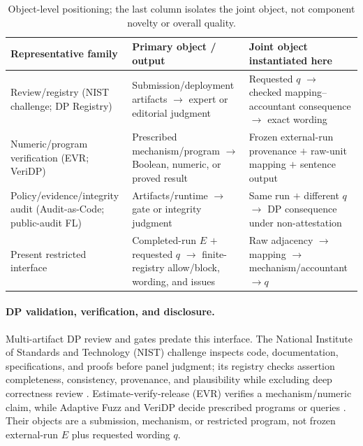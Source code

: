 \documentclass[letterpaper]{article} %
\begin{document}
\begin{table}[t]
\centering
{\small
\begin{tabular}{@{}p{}p{}p{}@{}}
\toprule
\raggedright\strut Representative family
& \raggedright\strut Primary object / output
& \raggedright\strut Joint object instantiated here \tabularnewline
\midrule
\raggedright\strut Review/registry (NIST challenge; DP Registry) \citep{ridgeway2021challenge,nist2025registry}
& \raggedright\strut Submission/deployment artifacts $\rightarrow$ expert or editorial judgment
& \raggedright\strut Requested $q$ $\rightarrow$ checked mapping--accountant consequence $\rightarrow$ exact wording \tabularnewline
\midrule
\raggedright\strut Numeric/program verification (EVR; VeriDP) \citep{wang2023randomized,narayan2015verifiable}
& \raggedright\strut Prescribed mechanism/program $\rightarrow$ Boolean, numeric, or proved result
& \raggedright\strut Frozen external-run provenance $+$ raw-unit mapping $+$ sentence output \tabularnewline
\midrule
\raggedright\strut Policy/evidence/integrity audit (Audit-as-Code; public-audit FL) \citep{muhammad2026audit,aljabbari2026public}
& \raggedright\strut Artifacts/runtime $\rightarrow$ gate or integrity judgment
& \raggedright\strut Same run $+$ different $q$ $\rightarrow$ DP consequence under non-attestation \tabularnewline
\midrule
\raggedright\strut Present restricted interface
& \raggedright\strut Completed-run $E$ $+$ requested $q$ $\rightarrow$ finite-registry allow/block, wording, and issues
& \raggedright\strut Raw adjacency $\rightarrow$ mapping $\rightarrow$ mechanism/accountant $\rightarrow q$ \tabularnewline
\bottomrule
\end{tabular}
}
\caption{Object-level positioning; the last column isolates the joint object, not component novelty or overall quality.}
\label{tab:closest-work}
\end{table}

\paragraph{DP validation, verification, and disclosure.}
Multi-artifact DP review and gates predate this interface. The National Institute of Standards and Technology (NIST) challenge inspects code, documentation, specifications, and proofs before panel judgment; its registry checks assertion completeness, consistency, provenance, and plausibility while excluding deep correctness review \citep{ridgeway2021challenge,nist2025registry}. Estimate-verify-release (EVR) verifies a mechanism/numeric claim, while Adaptive Fuzz and VeriDP decide prescribed programs or queries \citep{wang2023randomized,winogradcort2017adaptive,narayan2015verifiable}. Their objects are a submission, mechanism, or restricted program, not frozen external-run $E$ plus requested wording $q$.
\end{document}
